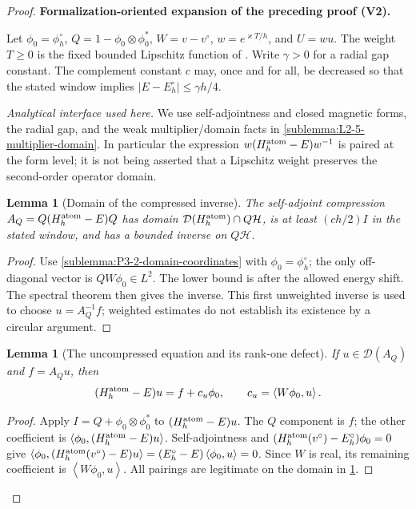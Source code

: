 \documentclass[11pt]{article}
\newtheorem{lemma}[theorem]{Lemma}
\newcommand{\formalisationparentid}{X}
\newenvironment{formalisationaddition}[1]{\par\medskip\begingroup\color{blue}\def\formalisationparentid{#1}\setcounter{formalizationsublemma}{0}\let\lemma\formalizationsublemma\let\endlemma\endformalizationsublemma
  \def\Eo{\mathcal E_h^\circ}\def\EE{\mathcal E_h}\def\phio{\phi_h^\circ}\def\phih{\phi_h}\def\Ho{H_h^{\rm atom}(v^\circ)}\def\Ha{H_h^{\rm atom}}\def\HL{H_h^{L}}\def\Dh{D_h}\def\Log{\operatorname{Log}}\def\ellh{\ell_h}\def\Gp{G_{p,h}}\def\Ast{A_{*,h}}\def\ahat{\widehat{\mathfrak a}_h}\def\ah{\mathfrak a_h}\def\rh{\widehat\rho_h}\def\deltah{\widehat\delta_h}\def\oldref##1{\textup{(##1)}}\def\interface##1{\par\noindent\textit{Analytical interface used here.} ##1\par}\def\finish{\par\noindent\textit{Conclusion of the formalization-oriented expansion.} }\par\noindent\textbf{Formalization-oriented expansion of the preceding proof (V2).}\par\smallskip
}{\par\endgroup\medskip
}
\newcommand{\ip}[2]{\left\langle #1,#2\right\rangle}
\begin{document}
\begin{proof}
\begin{formalisationaddition}{LA.2}
Let $\phi_0=\phio$, $Q=1-\phi_0\otimes\phi_0^*$, $W=v-v^\circ$,
$w=e^{\varkappa T/h}$, and $U=wu$. The weight $T\ge0$ is the fixed
bounded Lipschitz function of . Write $\gamma>0$
for a radial gap constant. The complement constant $c$ may, once and for
all, be decreased so that the stated window implies
$|E-E_h^\circ|\le\gamma h/4$.

\interface{We use self-adjointness and closed magnetic forms, the radial
gap, and the weak multiplier/domain facts in
\ref{sublemma:L2-5-multiplier-domain}. In particular the expression
$w(\Ha-E)w^{-1}$ is paired at the form level; it is not being asserted
that a Lipschitz weight preserves the second-order operator domain.}

\begin{lemma}[Domain of the compressed inverse]\label{sublemma:LA-2-compressed-domain}
The self-adjoint compression $A_Q=Q(\Ha-E)Q$ has domain
$\mathcal D(\Ha)\cap Q\mathcal H$, is at least $(ch/2)I$ in the stated
window, and has a bounded inverse on $Q\mathcal H$.
\end{lemma}
\begin{proof}
Use \ref{sublemma:P3-2-domain-coordinates} with $\phi_0=\phio$;
the only off-diagonal vector is $QW\phi_0\in L^2$.
The lower bound is  after the allowed
energy shift. The spectral theorem then gives the inverse. This first
unweighted inverse is used to choose $u=A_Q^{-1}f$; weighted estimates
do not establish its existence by a circular argument.
\end{proof}

\begin{lemma}[The uncompressed equation and its rank-one defect]\label{sublemma:LA-2-rank-one}
If $u\in\mathcal D(A_Q)$ and $f=A_Qu$, then
\[
 (\Ha-E)u=f+c_u\phi_0,\qquad c_u=\ip{W\phi_0}u.
\]
\end{lemma}
\begin{proof}
Apply $I=Q+\phi_0\otimes\phi_0^*$ to $(\Ha-E)u$.
The $Q$ component is $f$; the other coefficient is
$\ip{\phi_0}{(\Ha-E)u}$.
Self-adjointness and $(\Ho-E_h^\circ)\phi_0=0$ give
$\ip{\phi_0}{(\Ho-E)u}=(E_h^\circ-E)\ip{\phi_0}u=0$.
Since $W$ is real, its remaining coefficient is $\ip{W\phi_0}u$.
All pairings are legitimate on the domain in
\ref{sublemma:LA-2-compressed-domain}.
\end{proof}


\end{formalisationaddition}
\end{proof}
\end{document}
